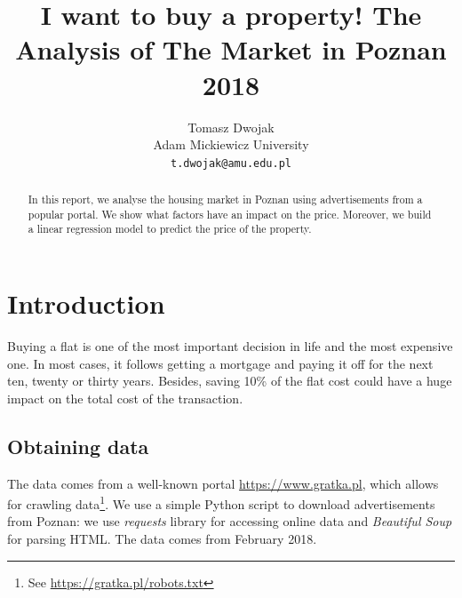 \documentclass[11pt,a4paper]{article}
\title{I want to buy a property! The Analysis of The Market in Poznan 2018}
\author{Tomasz Dwojak \\
  Adam Mickiewicz University \\
  {\tt t.dwojak@amu.edu.pl}
}
\date{}
\begin{document}
\maketitle
\begin{abstract}
  In this report, we analyse the housing market in Poznan using advertisements from a popular portal. We show what factors have an impact on the price. Moreover, we build a linear regression model to predict the price of the property.
\end{abstract}

\section{Introduction}
Buying a flat is one of the most important decision in life and the most expensive one. In most cases, it follows getting a mortgage and paying it off for the next ten, twenty or thirty years. Besides, saving 10\% of the flat cost could have a huge impact on the total cost of the transaction.


\subsection{Obtaining data}
The data comes from a well-known portal \url{https://www.gratka.pl}, which allows for crawling data\footnote{See \url{https://gratka.pl/robots.txt}}. We use a simple Python script to download advertisements from Poznan: we use \emph{requests} library for accessing online data and \emph{Beautiful Soup} for parsing HTML. The data comes from February 2018.
\end{document}
